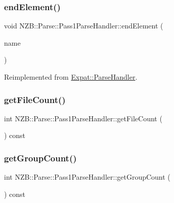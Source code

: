 \subsubsection{\texorpdfstring{end\+Element()}{endElement()}}
{\footnotesize\ttfamily void N\+Z\+B\+::\+Parse\+::\+Pass1\+Parse\+Handler\+::end\+Element (\begin{DoxyParamCaption}\item[{const X\+M\+L\+\_\+\+Char $\ast$}]{name }\end{DoxyParamCaption})\hspace{0.3cm}{\ttfamily [virtual]}}



Reimplemented from \hyperlink{class_expat_1_1_parse_handler_a13c775fa36138b4ee429e10b93177bec}{Expat\+::\+Parse\+Handler}.

\hypertarget{class_n_z_b_1_1_parse_1_1_pass1_parse_handler_ae61ae9069c299a17793e845c6ab1bbe5}{}\label{class_n_z_b_1_1_parse_1_1_pass1_parse_handler_ae61ae9069c299a17793e845c6ab1bbe5} 
\subsubsection{\texorpdfstring{get\+File\+Count()}{getFileCount()}}
{\footnotesize\ttfamily int N\+Z\+B\+::\+Parse\+::\+Pass1\+Parse\+Handler\+::get\+File\+Count (\begin{DoxyParamCaption}{ }\end{DoxyParamCaption}) const\hspace{0.3cm}{\ttfamily [inline]}}

\hypertarget{class_n_z_b_1_1_parse_1_1_pass1_parse_handler_a5ba1c886f45e0340dc22075f99ff51df}{}\label{class_n_z_b_1_1_parse_1_1_pass1_parse_handler_a5ba1c886f45e0340dc22075f99ff51df} 
\subsubsection{\texorpdfstring{get\+Group\+Count()}{getGroupCount()}}
{\footnotesize\ttfamily int N\+Z\+B\+::\+Parse\+::\+Pass1\+Parse\+Handler\+::get\+Group\+Count (\begin{DoxyParamCaption}{ }\end{DoxyParamCaption}) const\hspace{0.3cm}{\ttfamily [inline]}}

